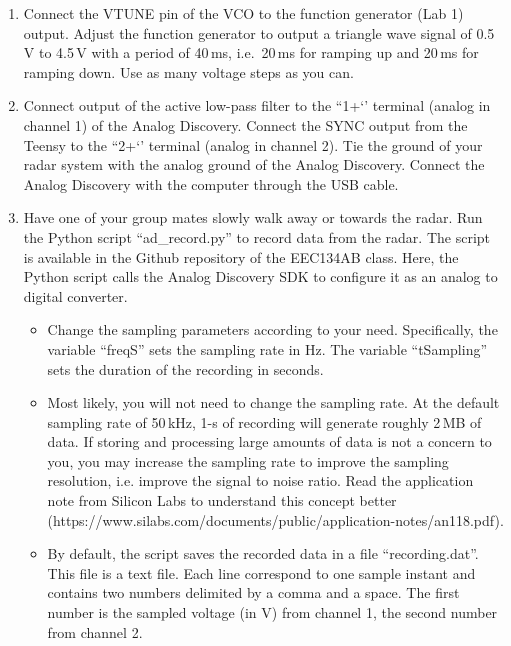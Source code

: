 \documentclass[letterpaper, 11pt]{article}
\begin{document}
\begin{enumerate}
	\item Connect the VTUNE pin of the VCO to the  function generator (Lab 1) output. Adjust the  function generator to output a triangle wave signal of 0.5\,V to 4.5\,V with a period of 40\,ms, i.e.~20\,ms for ramping up and 20\,ms for ramping down. Use as many voltage steps as you can. 
	
	\item Connect output of the active low-pass filter to the ``1+‘’ terminal (analog in channel 1) of the Analog Discovery. Connect the SYNC output from the Teensy to the ``2+‘’ terminal (analog in channel 2). Tie the ground of your radar system with the analog ground of the Analog Discovery. Connect the Analog Discovery with the computer through the USB cable. 
	
	\item Have one of your group mates slowly walk away or towards the radar. Run the Python script ``ad\_record.py'' to record data from the radar. The script is available in the Github repository of the EEC134AB class. Here, the Python script calls the Analog Discovery SDK to configure it as an analog to digital converter. 
		\begin{itemize}
			\item Change the sampling parameters according to your need. Specifically, the variable ``freqS'' sets the sampling rate in Hz. The variable ``tSampling'' sets the duration of the recording in seconds. 
			
			\item Most likely, you will not need to change the sampling rate. At the default sampling rate of 50\,kHz, 1-s of recording will generate roughly 2\,MB of data. If storing and processing large amounts of data is not a concern to you, you may increase the sampling rate to improve the sampling resolution, i.e. improve the signal to noise ratio. Read the application note from Silicon Labs to understand this concept better (https://www.silabs.com/documents/public/application-notes/an118.pdf). 
			
			\item By default, the script saves the recorded data in a file ``recording.dat''. This file is a text file. Each line correspond to one sample instant and contains two numbers delimited by a comma and a space. The first number is the sampled voltage (in V) from channel 1, the second number from channel 2. 
		\end{itemize}
	

\end{enumerate}
\end{document}
